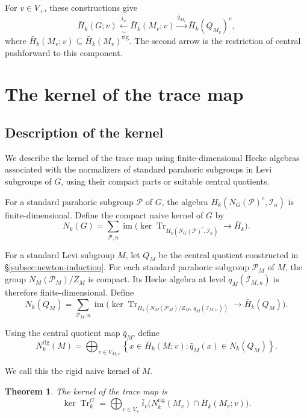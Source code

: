 \documentclass[11pt,letterpaper]{amsart}
\newtheorem{theorem}{Theorem}
\theoremstyle{definition}
\numberwithin{equation}{section}
\numberwithin{theorem}{section}
\newcommand{\kk}{k}
\newcommand{\CI}{\mathcal I}
\newcommand{\rig}{\mathrm{rig}}
\DeclareMathOperator{\Tr}{Tr}
\DeclareMathOperator{\im}{im}
\begin{document}
For $v\in V_+$, these constructions give
\[
 \bar H_\kk(G;v)
   \xleftarrow[\sim]{\bar i_v}\bar H_\kk(M_v;v)
   \xrightarrow{\bar q_{M_v}}\bar H_\kk(Q_{M_v})^c,
\]
where $\bar H_\kk(M_v;v)\subseteq\bar H_\kk(M_v)^{\rig}$.
The second arrow is the restriction of central pushforward to this component. 

\section{The kernel of the trace map}

\label{sec:kernel}
\subsection{Description of the kernel}

We describe the kernel of the trace map using finite-dimensional Hecke algebras associated with the normalizers of standard parahoric subgroups in Levi subgroups of $G$, using their compact parts or suitable central quotients.

For a standard parahoric subgroup $\mathcal P$ of $G$,
the algebra $H_\kk(N_G(\mathcal P)^c,\CI_n)$ is
finite-dimensional.
Define the compact naive kernel of $G$ by
\[
 N_\kk(G)=\sum_{\mathcal P,n}
   \im\bigl(
     \ker\Tr_{H_\kk(N_G(\mathcal P)^c,\CI_n)}
     \to\bar H_\kk
   \bigr).
\]

For a standard Levi subgroup $M$, let $Q_M$ be the central quotient constructed in \S\ref{subsec:newton-induction}.
For each standard parahoric subgroup $\mathcal P_M$ of $M$,
the group $N_M(\mathcal P_M)/Z_M$ is compact. Its Hecke
algebra at level $q_M(\CI_{M,n})$ is therefore
finite-dimensional. Define
\[
 N_\kk(Q_M)=\sum_{\mathcal P_M,n}
   \im\bigl(
     \ker\Tr_{H_\kk(N_M(\mathcal P_M)/Z_M,\,q_M(\CI_{M,n}))}
     \to\bar H_\kk(Q_M)
   \bigr).
\]

Using the central quotient map $\bar q_M$, define
\begin{equation}\label{eq:levi-rigid-naive-kernel}
 N_\kk^{\rig}(M)
   =\bigoplus_{v\in V_{M,c}}
      \left\{
        x\in\bar H_\kk(M;v):
        \bar q_M(x)\in N_\kk(Q_M)
      \right\}.
\end{equation}

We call this the rigid naive kernel of $M$.

\begin{theorem}
\label{thm:whole-kernel}
The kernel of the trace map is
\[
 \ker\Tr_\kk^G
   =\bigoplus_{v\in V_+}
      \bar i_v\bigl(
        N_\kk^{\rig}(M_v)\cap\bar H_\kk(M_v;v)
      \bigr).
\]
\end{theorem}
\end{document}

